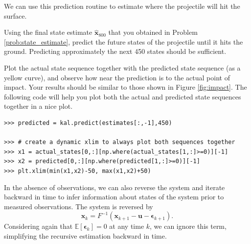 We can use this prediction routine to estimate where the projectile will hit the surface.
\begin{problem}
Using the final state estimate $\widehat{\mathbf{x}}_{800}$ that you obtained in Problem \ref{prob:state_estimate}, predict the future states of the projectile until it hits the ground.
Predicting approximately the next 450 states should be sufficient.

Plot the actual state sequence together with the predicted state sequence (as a yellow curve), and observe how near the prediction is to the actual point of impact.
Your results should be similar to those shown in Figure \ref{fig:impact}.
The following code will help you plot both the actual and predicted state sequences together in a nice plot.
\begin{lstlisting}
>>> predicted = kal.predict(estimates[:,-1],450)

>>> # create a dynamic xlim to always plot both sequences together
>>> x1 = actual_states[0,:][np.where(actual_states[1,:]>=0)][-1]
>>> x2 = predicted[0,:][np.where(predicted[1,:]>=0)][-1]
>>> plt.xlim(min(x1,x2)-50, max(x1,x2)+50)
\end{lstlisting}

\end{problem}

In the absence of observations, we can also reverse the system and iterate backward in time to infer information about states of the system prior to measured observations.
The system is reversed by
\begin{equation*}
\mathbf{x}_{k} = F^{-1}(\mathbf{x}_{k+1} - \mathbf{u} - \boldsymbol{\epsilon}_{k+1}).
\end{equation*}
Considering again that $\mathbb{E}\left[\boldsymbol{\epsilon}_{k}\right] = 0$ at any time $k$, we can ignore this term, simplifying the recursive estimation backward in time.

